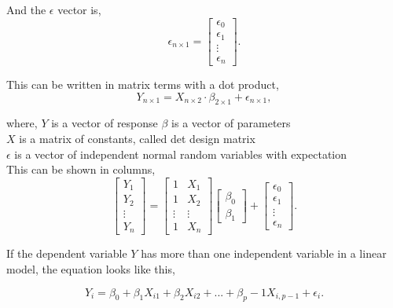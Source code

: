 \noindent And the $\epsilon$ vector is,
$$ \epsilon_{n \times 1} =
\left[
\begin{array}{c}
	\epsilon_0 \\ 
	\epsilon_1 \\
	\vdots \\
	\epsilon_n 
\end{array}
\right].
$$

\noindent This can be written in matrix terms with a dot product, 
$$Y_{n \times 1}=X_{n \times 2} \cdot \beta_{2 \times 1} + \epsilon_{n \times 1} ,$$	

\noindent where, \newline
\textbf{$Y$} is a vector of response \newline
\textbf{$\beta$} is a vector of parameters \\
\textbf{$X$} is a matrix of constants, called det design matrix\\
\textbf{$\epsilon$} is a vector of independent normal random variables with expectation\\

\noindent This can be shown in columns,
$$
\left[
\begin{array}{c}
	Y_1 \\ 
	Y_2 \\ 
	\vdots \\
	Y_n 
\end{array}
\right]
=
\left[
\begin{array}{cc}
	1 & X_1 \\ 
	1 & X_2 \\ 
	\vdots & \vdots \\
	1 & X_n
\end{array}
\right]
\left[
\begin{array}{c}
	\beta_0 \\ 
	\beta_1 
\end{array}
\right]
+
\left[
\begin{array}{c}
	\epsilon_0 \\ 
	\epsilon_1 \\
	\vdots \\
	\epsilon_n 
\end{array}
\right].
$$

\noindent If the dependent variable $Y$ has more than one independent variable in a linear model, the equation looks like this, 

$$Y_i = \beta_0 + \beta_1 X_{i1} + \beta_2 X_{i2} + ... + \beta_p-1 X_{i, p-1} + \epsilon_i .$$

